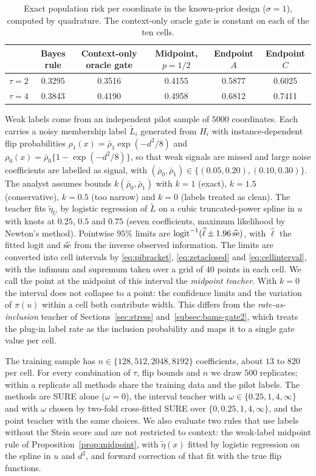 \documentclass[11pt]{article}
\theoremstyle{plain}
\theoremstyle{definition}
\theoremstyle{remark}
\DeclareMathOperator{\logit}{logit}
\begin{document}
\begin{table}[htbp]
\centering
\caption{Exact population risk per coordinate in the known-prior design ($\sigma=1$),
computed by quadrature. The context-only oracle gate is constant on each of the ten cells.}
\label{tab:poprisk}
\begin{tabular}{lccccc}
\toprule
 & Bayes rule & Context-only oracle gate & Midpoint, $p=1/2$ & Endpoint $A$ & Endpoint $C$\\
\midrule
$\tau=2$ & 0.3295 & 0.3516 & 0.4155 & 0.5877 & 0.6025\\
$\tau=4$ & 0.3843 & 0.4190 & 0.4958 & 0.6812 & 0.7411\\
\bottomrule
\end{tabular}
\end{table}

Weak labels come from an independent pilot sample of $5000$ coordinates. Each carries a
noisy membership label $\widetilde L_i$ generated from $H_i$ with instance-dependent flip
probabilities $\rho_1(x)=\bar\rho_1\exp(-d^2/8)$ and $\rho_0(x)=\bar\rho_0\{1-\exp(-d^2/8)\}$,
so that weak signals are missed and large noise coefficients are labelled as signal, with
$(\bar\rho_0,\bar\rho_1)\in\{(0.05,0.20),(0.10,0.30)\}$. The analyst assumes bounds
$k(\bar\rho_0,\bar\rho_1)$ with $k=1$ (exact), $k=1.5$ (conservative), $k=0.5$ (too narrow)
and $k=0$ (labels treated as clean). The teacher fits $\widetilde\eta_U$ by logistic regression
of $\widetilde L$ on a cubic truncated-power spline in $u$ with knots at $0.25$, $0.5$ and $0.75$
(seven coefficients, maximum likelihood by Newton's method). Pointwise $95\%$ limits are
$\logit^{-1}(\widehat\ell\pm1.96\,\widehat{\rm se})$, with $\widehat\ell$ the fitted logit and
$\widehat{\rm se}$ from the inverse observed information. The limits are converted into cell
intervals by \eqref{eq:pibracket}, \eqref{eq:zetaclosed} and \eqref{eq:cellinterval}, with the
infimum and supremum taken over a grid of $40$ points in each cell. We call the point at the
midpoint of this interval the \emph{midpoint teacher}. With $k=0$ the interval does not collapse
to a point: the confidence limits and the variation of $\pi(u)$ within a cell both contribute
width. This differs from the \emph{rate-as-inclusion} teacher of Sections~\ref{sec:stress}
and~\ref{subsec:bams-gate2}, which treats the plug-in label rate as the inclusion probability and
maps it to a single gate value per cell.

The training sample has $n\in\{128,512,2048,8192\}$ coefficients, about $13$ to $820$ per cell.
For every combination of $\tau$, flip bounds and $n$ we draw $500$ replicates; within a
replicate all methods share the training data and the pilot labels. The methods are SURE alone
($\omega=0$), the interval teacher with $\omega\in\{0.25,1,4,\infty\}$ and with $\omega$ chosen by
two-fold cross-fitted SURE over $\{0,0.25,1,4,\infty\}$, and the point teacher with the same
choices. We also evaluate two rules that use labels without the Stein score and are not
restricted to context: the weak-label midpoint rule of Proposition~\ref{prop:midpoint}, with
$\widetilde\eta(x)$ fitted by logistic regression on the spline in $u$ and $d^2$, and forward
correction of that fit with the true flip functions.
\end{document}

